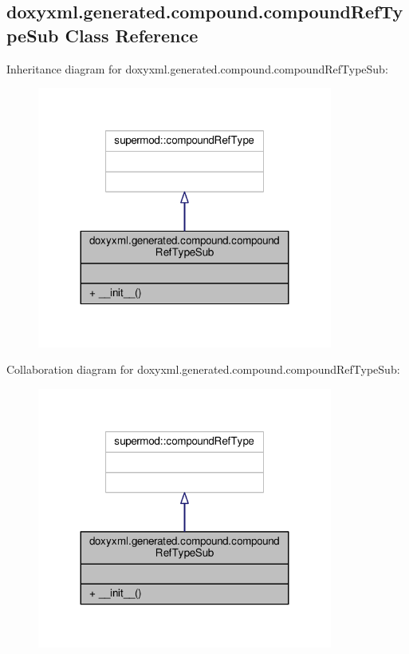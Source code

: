 \subsection{doxyxml.\+generated.\+compound.\+compound\+Ref\+Type\+Sub Class Reference}
\label{classdoxyxml_1_1generated_1_1compound_1_1compoundRefTypeSub}


Inheritance diagram for doxyxml.\+generated.\+compound.\+compound\+Ref\+Type\+Sub\+:
\nopagebreak
\begin{figure}[H]
\begin{center}
\leavevmode
\includegraphics[width=275pt]{dd/dc5/classdoxyxml_1_1generated_1_1compound_1_1compoundRefTypeSub__inherit__graph}
\end{center}
\end{figure}


Collaboration diagram for doxyxml.\+generated.\+compound.\+compound\+Ref\+Type\+Sub\+:
\nopagebreak
\begin{figure}[H]
\begin{center}
\leavevmode
\includegraphics[width=275pt]{df/db4/classdoxyxml_1_1generated_1_1compound_1_1compoundRefTypeSub__coll__graph}
\end{center}
\end{figure}
